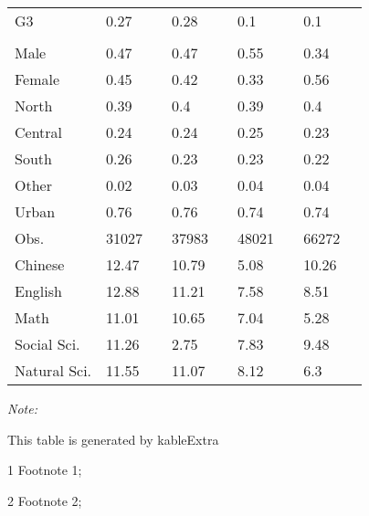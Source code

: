 \begin{table}
\begin{threeparttable}
\begin{tabular}[t]{lllllllll}
\hspace{1em}G3 & 0.27 &  & 0.28 &  & 0.1 &  & 0.1 & \\
\addlinespace[0.3em]
\multicolumn{9}{l}{\textit{\textbf{Panel D: Demographic}}}\\
\hspace{1em}Male & 0.47 &  & 0.47 &  & 0.55 &  & 0.34 & \\
\hspace{1em}Female & 0.45 &  & 0.42 &  & 0.33 &  & 0.56 & \\
\hspace{1em}North & 0.39 &  & 0.4 &  & 0.39 &  & 0.4 & \\
\hspace{1em}Central & 0.24 &  & 0.24 &  & 0.25 &  & 0.23 & \\
\hspace{1em}South & 0.26 &  & 0.23 &  & 0.23 &  & 0.22 & \\
\hspace{1em}Other & 0.02 &  & 0.03 &  & 0.04 &  & 0.04 & \\
\hspace{1em}Urban & 0.76 &  & 0.76 &  & 0.74 &  & 0.74 & \\
Obs. & 31027 &  & 37983 &  & 48021 &  & 66272 & \\
Chinese & 12.47 &  & 10.79 &  & 5.08 &  & 10.26 & \\
English & 12.88 &  & 11.21 &  & 7.58 &  & 8.51 & \\
Math & 11.01 &  & 10.65 &  & 7.04 &  & 5.28 & \\
Social Sci. & 11.26 &  & 2.75 &  & 7.83 &  & 9.48 & \\
Natural Sci. & 11.55 &  & 11.07 &  & 8.12 &  & 6.3 & \\
\bottomrule
\end{tabular}
\begin{tablenotes}
\item \textit{Note: } 
\item This table is generated by kableExtra
\item[1] Footnote 1; 
\item[2] Footnote 2; 
\end{tablenotes}
\end{threeparttable}
\end{table}
